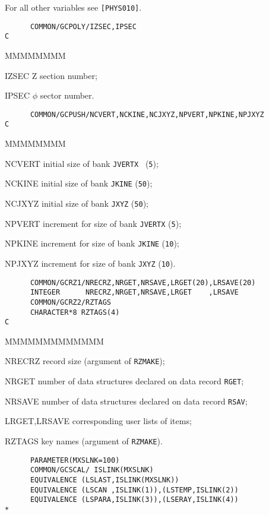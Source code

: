 For all other variables see {\tt [PHYS010]}.
\begin{verbatim}
      COMMON/GCPOLY/IZSEC,IPSEC
C
\end{verbatim}
\begin{DLtt}{MMMMMMMM}
\item[IZSEC]    Z  section number;
\item[IPSEC]    $\phi$ sector number.
\end{DLtt}
\begin{verbatim}
      COMMON/GCPUSH/NCVERT,NCKINE,NCJXYZ,NPVERT,NPKINE,NPJXYZ
C
\end{verbatim}
\begin{DLtt}{MMMMMMMM}
\item[NCVERT] initial size of bank {\tt JVERTX } ({\tt 5});
\item[NCKINE] initial size of bank {\tt JKINE}  ({\tt 50});
\item[NCJXYZ] initial size of bank {\tt JXYZ}  ({\tt 50});
\item[NPVERT] increment for size of bank {\tt JVERTX}  ({\tt 5});
\item[NPKINE] increment for size of bank {\tt JKINE}  ({\tt 10});
\item[NPJXYZ] increment for size of bank {\tt JXYZ}  ({\tt 10}).
\end{DLtt}
\begin{verbatim}
      COMMON/GCRZ1/NRECRZ,NRGET,NRSAVE,LRGET(20),LRSAVE(20)
      INTEGER      NRECRZ,NRGET,NRSAVE,LRGET    ,LRSAVE
      COMMON/GCRZ2/RZTAGS
      CHARACTER*8 RZTAGS(4)
C
\end{verbatim}
\begin{DLtt}{MMMMMMMMMMMMM}
\item[NRECRZ] record size (argument of {\tt RZMAKE});
\item[NRGET]  number of data structures declared on data record {\tt RGET};
\item[NRSAVE] number of data structures declared on data record {\tt RSAV};
\item[LRGET,LRSAVE] corresponding user lists of items;
\item[RZTAGS]key names (argument of {\tt RZMAKE}).
\end{DLtt}
\begin{verbatim}
      PARAMETER(MXSLNK=100)
      COMMON/GCSCAL/ ISLINK(MXSLNK)
      EQUIVALENCE (LSLAST,ISLINK(MXSLNK))
      EQUIVALENCE (LSCAN ,ISLINK(1)),(LSTEMP,ISLINK(2))
      EQUIVALENCE (LSPARA,ISLINK(3)),(LSERAY,ISLINK(4))
*
\end{verbatim}
